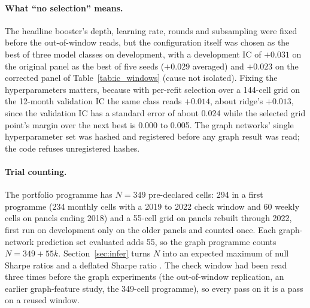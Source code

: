 \paragraph{What ``no selection'' means.}
The headline booster's depth, learning rate, rounds and subsampling were fixed before the out-of-window reads, but the configuration itself was chosen as the best of three model classes on development, with a development IC of $+0.031$ on the original panel as the best of five seeds ($+0.029$ averaged) and $+0.023$ on the corrected panel of Table~\ref{tab:ic_windows} (cause not isolated). Fixing the hyperparameters matters, because with per-refit selection over a 144-cell grid on the 12-month validation IC the same class reads $+0.014$, about ridge's $+0.013$, since the validation IC has a standard error of about 0.024 while the selected grid point's margin over the next best is 0.000 to 0.005. The graph networks' single hyperparameter set was hashed and registered before any graph result was read; the code refuses unregistered hashes.

\paragraph{Trial counting.}
The portfolio programme has $N=349$ pre-declared cells: 294 in a first programme (234 monthly cells with a 2019 to 2022 check window and 60 weekly cells on panels ending 2018) and a 55-cell grid on panels rebuilt through 2022, first run on development only on the older panels and counted once. Each graph-network prediction set evaluated adds 55, so the graph programme counts $N=349+55k$. Section~\ref{sec:infer} turns $N$ into an expected maximum of null Sharpe ratios and a deflated Sharpe ratio \citep{baileylopez2014}. The check window had been read three times before the graph experiments (the out-of-window replication, an earlier graph-feature study, the 349-cell programme), so every pass on it is a pass on a reused window.
